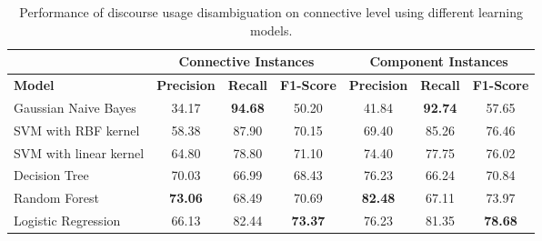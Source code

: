 \begin{table}[ht]
\centering
\begin{tabular}{|l|c|c|c|c|c|c|}
\hline
                            & \multicolumn{3}{|c|}{Connective Instances} & \multicolumn{3}{c|}{Component Instances}  \\ \hline
\bf Model                   & \bf Precision & \bf Recall & \bf F1-Score  & \bf Precision & \bf Recall & \bf F1-Score \\ \hline
    Gaussian Naive Bayes    &     34.17     & \bf 94.68  &     50.20     &     41.84     & \bf 92.74  &     57.65    \\ \hline
    SVM with RBF kernel     &     58.38     &     87.90  &     70.15     &     69.40     &     85.26  &     76.46    \\ \hline
    SVM with linear kernel  &     64.80     &     78.80  &     71.10     &     74.40     &     77.75  &     76.02    \\ \hline
    Decision Tree           &     70.03     &     66.99  &     68.43     &     76.23     &     66.24  &     70.84    \\ \hline
    Random Forest           & \bf 73.06     &     68.49  &     70.69     & \bf 82.48     &     67.11  &     73.97    \\ \hline
    Logistic Regression     &     66.13     &     82.44  & \bf 73.37     &     76.23     &     81.35  & \bf 78.68    \\ \hline

\end{tabular}
\caption{\label{t:recognition-connective-models} Performance of discourse usage
disambiguation on connective level using different learning models. }
\end{table}

